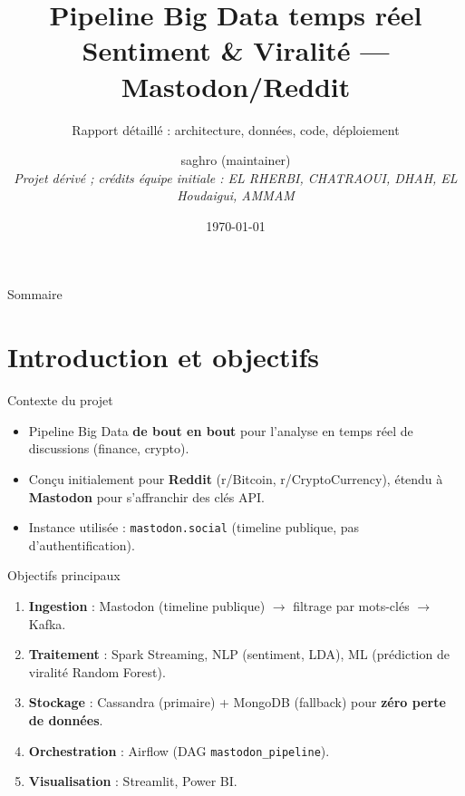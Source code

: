 \documentclass[11pt,aspectratio=169]{beamer}
\title[Pipeline Big Data]{Pipeline Big Data temps réel\\Sentiment \& Viralité — Mastodon/Reddit}
\subtitle{Rapport détaillé : architecture, données, code, déploiement}
\author{
  saghro (maintainer)\\
  \small\textit{Projet dérivé ; crédits équipe initiale : EL RHERBI, CHATRAOUI, DHAH, EL Houdaigui, AMMAM}
}
\institute{Projet Big Data}
\date{\today}
\begin{document}
\frame{\titlepage}

\begin{frame}{Sommaire}
  \tableofcontents
\end{frame}

\section{Introduction et objectifs}

\begin{frame}{Contexte du projet}
  \begin{itemize}[leftmargin=*]
    \item Pipeline Big Data \textbf{de bout en bout} pour l'analyse en temps réel de discussions (finance, crypto).
    \item Conçu initialement pour \textbf{Reddit} (r/Bitcoin, r/CryptoCurrency), étendu à \textbf{Mastodon} pour s'affranchir des clés API.
    \item Instance utilisée : \texttt{mastodon.social} (timeline publique, pas d'authentification).
  \end{itemize}
\end{frame}

\begin{frame}{Objectifs principaux}
  \begin{enumerate}[leftmargin=*]
    \item \textbf{Ingestion} : Mastodon (timeline publique) $\rightarrow$ filtrage par mots-clés $\rightarrow$ Kafka.
    \item \textbf{Traitement} : Spark Streaming, NLP (sentiment, LDA), ML (prédiction de viralité Random Forest).
    \item \textbf{Stockage} : Cassandra (primaire) + MongoDB (fallback) pour \textbf{zéro perte de données}.
    \item \textbf{Orchestration} : Airflow (DAG \texttt{mastodon\_pipeline}).
    \item \textbf{Visualisation} : Streamlit, Power BI.
  \end{enumerate}
\end{frame}

\end{document}
